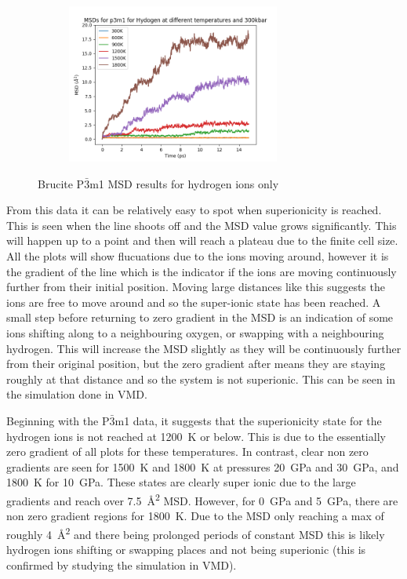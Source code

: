 \documentclass[a4paper,12pt]{article}
\begin{document}
\begin{figure}[h!!!!!!!!!!!!!!!!!!!!!]
\begin{subfigure}[t]{0.5\textwidth}
	\label{Fig8d}
\end{subfigure}%
\\
	\begin{subfigure}[t]{0.5\textwidth}
	\centering
	\includegraphics[width=7cm]{figures/p3m1_msd_H_p300.png}
	\label{Fig8e}
\end{subfigure}%
	\caption{Brucite P$\bar{3}$m1 MSD results for hydrogen ions only}
	\label{Fig8}
\end{figure}

From this data it can be relatively easy to spot when superionicity is reached. This is seen when the line shoots off and the MSD value grows significantly. This will happen up to a point and then will reach a plateau due to the finite cell size. All the plots will show flucuations due to the ions moving around, however it is the gradient of the line which is the indicator if the ions are moving continuously further from their initial position. Moving large distances like this suggests the ions are free to move around and so the super-ionic state has been reached. A small step before returning to zero gradient in the MSD is an indication of some ions shifting along to a neighbouring oxygen, or swapping with a neighbouring hydrogen. This will increase the MSD slightly as they will be continuously further from their original position, but the zero gradient after means they are staying roughly at that distance and so the system is not superionic. This can be seen in the simulation done in VMD.

Beginning with the P$\bar{3}$m1 data, it suggests that the superionicity state for the hydrogen ions is not reached at \SI{1200}{\K} or below. This is due to the essentially zero gradient of all plots for these temperatures. In contrast, clear non zero gradients are seen for \SI{1500}{\K} and \SI{1800}{\K} at pressures \SI{20}{\GPa} and \SI{30}{\GPa}, and \SI{1800}{\K} for \SI{10}{\GPa}. These states are clearly super ionic due to the large gradients and reach over \SI{7.5}{\AA^2} MSD. However, for \SI{0}{\GPa} and \SI{5}{\GPa}, there are non zero gradient regions for \SI{1800}{\K}. Due to the MSD only reaching a max of roughly \SI{4}{\AA^2} and there being prolonged periods of constant MSD this is likely hydrogen ions shifting or swapping places and not being superionic (this is confirmed by studying the simulation in VMD).
\end{document}
